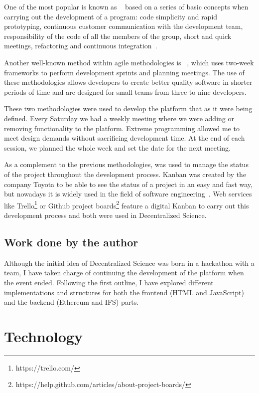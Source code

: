 One of the most popular is known as ~\cite{lindstrom2004extreme} based on a series of basic concepts when
carrying out the development of a program: code simplicity and rapid
prototyping, continuous customer communication with the development team,
responsibility of the code of all the members of the group, short and quick
meetings, refactoring and continuous integration~\cite{theunissen2005search}.

Another well-known method within agile methodologies is
~\cite{rising2000scrum}, which uses two-week frameworks to perform
development sprints and planning meetings. The use of these methodologies allows
developers to create better quality software in shorter periods of time and are
designed for small teams from three to nine developers.

These two methodologies were used to develop the platform that as it were being
defined. Every Saturday we had a weekly meeting where we were adding or removing
functionality to the platform. Extreme programming allowed me to meet design
demands without sacrificing development time. At the end of each session, we
planned the whole week and set the date for the next meeting.

As a complement to the previous methodologies,  was used to manage the
status of the project throughout the development process. Kanban was created by
the company Toyota to be able to see the status of a project in an easy and fast
way, but nowadays it is widely used in the field of software
engineering~\cite{ahmad2013kanban}. Web services like
Trello\footnote{https://trello.com/} or Github project
boards\footnote{https://help.github.com/articles/about-project-boards/} feature
a digital Kanban to carry out this development process and both were used in
Decentralized Science.

\subsection{Work done by the author}

Although the initial idea of Decentralized Science was born in a hackathon with
a team, I have taken charge of continuing the development of the platform when
the event ended. Following the first outline, I have explored different
implementations and structures for both the frontend (HTML and JavaScript) and
the backend (Ethereum and IFS) parts.

\section{Technology}
\label{tech}

